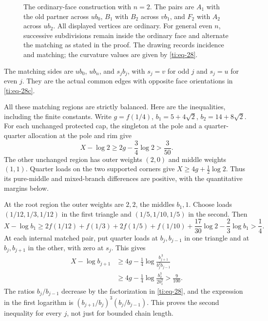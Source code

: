 \documentclass[11pt]{article}
\numberwithin{equation}{section}
\theoremstyle{definition}\newtheorem{definition}[theorem]{Definition}
\theoremstyle{remark}\newtheorem{remark}[theorem]{Remark}
\begin{document}
\begin{figure}[htbp]
\centering

\caption{The ordinary-face construction with \(n=2\).
The pairs are \(A_1\) with the old partner across \(ub_0\),
\(B_1\) with \(B_2\) across \(vb_1\), and \(F_2\) with \(A_2\)
across \(ub_2\). All displayed vertices are ordinary.
For general even \(n\), successive subdivisions remain inside the
ordinary face and alternate the matching as stated in the proof.
The drawing records incidence and matching; the curvature values
are given by \eqref{ti:eq-28}.}
\label{fig:ordinary-triangular-zigzag}
\end{figure}
 The matching sides are \(ub_0\), \(ub_n\), and \(s_jb_j\), with \(s_j=v\) for odd \(j\) and \(s_j=u\) for even \(j\). They are the actual common edges with opposite face orientations in \eqref{ti:eq-28c}.

All these matching regions are strictly balanced. Here are the inequalities, including the finite constants. Write \(g=f(1/4)\), \(b_1=5+4\sqrt2\), \(b_2=14+8\sqrt2\). For each unchanged protected cap, the singleton at the pole and a quarter-quarter allocation at the pole and rim give
\begin{equation}\label{ti:eq-28d}
X-\log2\ge2g-\frac34\log2>\frac3{50}.
\end{equation}
The other unchanged region has outer weights \((2,0)\) and middle
weights \((1,1)\). Quarter loads on the two supported corners give
\(X\ge4g+\tfrac12\log2\). Thus its pure-middle and mixed-branch
differences are positive, with the quantitative margins below.

At the root region the outer weights are \(2,2\), the middles \(b_1,1\). Choose loads \((1/12,1/3,1/12)\) in the first triangle and \((1/5,1/10,1/5)\) in the second. Then
\begin{equation}\label{ti:eq-28e}
X-\log b_1\ge
2f(1/12)+f(1/3)+2f(1/5)+f(1/10)
+\frac{17}{30}\log2-\frac23\log b_1>\frac14.
\end{equation}
At each internal matched pair, put quarter loads at \(b_j,b_{j-1}\) in one triangle and at \(b_j,b_{j+1}\) in the other, with zero at \(s_j\). This gives
\begin{equation}\label{ti:eq-28f}
\begin{aligned}
X-\log b_{j+1}
&\ge4g-\frac14\log\frac{b_{j+1}^{\,3}}{b_j^2b_{j-1}}\\
&\ge4g-\frac14\log\frac{b_2^3}{2b_1^2}>\frac9{100}.
\end{aligned}
\end{equation}
The ratios \(b_j/b_{j-1}\) decrease by the factorization in \eqref{ti:eq-28}, and the expression in the first logarithm is \((b_{j+1}/b_j)^3(b_j/b_{j-1})\). This proves the second inequality for every \(j\), not just for bounded chain length.
\end{document}
